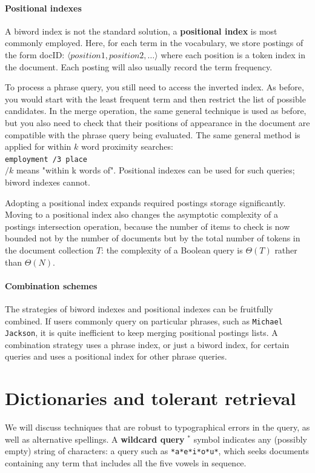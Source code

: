 \documentclass[letterpaper,11pt]{article}
\newcommand{\code}[1]{\texttt{#1}}
\begin{document}
\paragraph{Positional indexes}
A biword index is not the standard solution, a \textbf{positional index} is most commonly employed. Here, for each term in the vocabulary, we store postings of the form docID: $\langle position1, position2, \dots \rangle$ where each position is a token index in the document. Each posting will also usually record the term frequency. 

To process a phrase query, you still need to access the inverted index. As before, you would start with the least frequent term and then restrict the list of possible candidates. In the merge operation, the same general technique is used as before, but you also need to check that their positions of appearance in the document are compatible with the phrase query being evaluated. The same general method is applied for within $k$ word proximity searches:
\medskip\\
\code{employment /3 place}
\medskip\\
$/k$ means "within k words of". Positional indexes can be used for such queries; biword indexes cannot.

Adopting a positional index expands required postings storage significantly. Moving to a positional index also changes the asymptotic complexity of a postings intersection operation, because the number of items to check is now bounded not by the number of documents but by the total number of tokens in the document collection $T$: the complexity of a Boolean query is $\Theta(T)$ rather than $\Theta(N)$.

\paragraph{Combination schemes}
The strategies of biword indexes and positional indexes can be fruitfully combined. If users commonly query on particular phrases, such as \code{Michael Jackson}, it is quite inefficient to keep merging positional postings lists. A combination strategy uses a phrase index, or just a biword index, for certain queries and uses a positional index for other phrase queries.

\section{Dictionaries and tolerant retrieval}
We will discuss techniques that are robust to typographical errors in the query, as well as alternative spellings. A \textbf{wildcard query} $^*$ symbol indicates any (possibly empty) string of characters: a query such as \code{*a*e*i*o*u*}, which seeks documents containing any term that includes all the five vowels in sequence.
\end{document}
